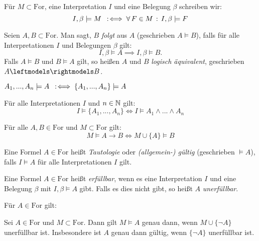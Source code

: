 \documentclass{cheat-sheet}
\newcommand{\Ibm}{I, \beta \models}
\newcommand{\For}{\mathrm{For}} %
\newcommand{\eqmodels}{\leftmodels \rightmodels} %
\begin{document}
\begin{nota}
  Für $M \subset \For$, eine Interpretation $I$ und eine Belegung $\beta$ schreiben wir:
  \[ \Ibm M \coloniff \fa{F \in M} \Ibm F \]
\end{nota}

\begin{defn}
  Seien $A, B \subset \For$. Man sagt, $B$ \emph{folgt} aus $A$ (geschrieben $A \models B$), falls für alle Interpretationen $I$ und Belegungen $\beta$ gilt:
  \[ \Ibm A \implies \Ibm B. \]
  Falls $A \models B$ und $B \models A$ gilt, so heißen $A$ und $B$ \emph{logisch äquivalent}, geschrieben $A \eqmodels B$.
\end{defn}

\begin{nota}
  $A_1, ..., A_n \models A \enspace:\!\iff \{ A_1, ..., A_n \} \models A$
\end{nota}

\begin{satz}
  Für alle Interpretationen $I$ und $n \in \mathbb{N}$ gilt:
  \[ I \models \{ A_1, ..., A_n \} \iff I \models A_1 \wedge ... \wedge A_n \]
\end{satz}

\begin{satz}
  Für alle $A, B \in \For$ und $M \subset \For$ gilt:
  \[ M \models A \to B \iff M \cup \{A\} \models B \]
\end{satz}

\begin{defn}
  Eine Formel $A \in \For$ heißt \emph{Tautologie} oder \emph{(allgemein-) gültig} (geschrieben $\models A$), falls $I \models A$ für alle Interpretationen $I$ gilt.
\end{defn}

\begin{defn}
  Eine Formel $A \in \For$ heißt \emph{erfüllbar}, wenn es eine Interpretation $I$ und eine Belegung $\beta$ mit $\Ibm A$ gibt. Falls es dies nicht gibt, so heißt $A$ \emph{unerfüllbar}.
\end{defn}

\begin{satz}
  Für $A \in \For$ gilt:
  \begin{itemize}
  \end{itemize}
\end{satz}

\begin{satz}
  Sei $A \in \For$ und $M \subset \For$. Dann gilt $M \models A$ genau dann, wenn $M \cup \{ \neg A \}$ unerfüllbar ist. Insbesondere ist $A$ genau dann gültig, wenn $\{ \neg A \}$ unerfüllbar ist.
\end{satz}
\end{document}
